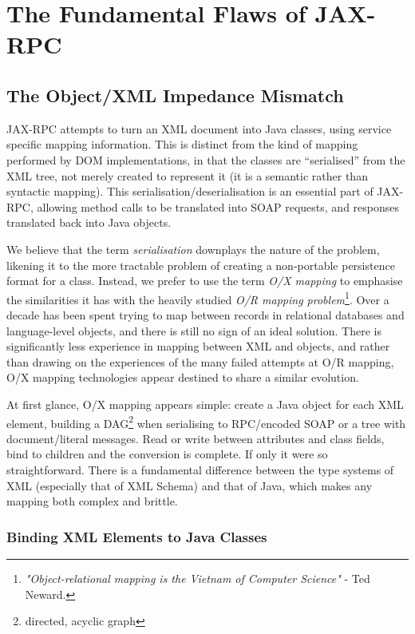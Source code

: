\section{The Fundamental Flaws of JAX-RPC}
\label{objections}

\subsection{The Object/XML Impedance Mismatch}
\label{objections:o-x}

JAX-RPC attempts to turn an XML document into Java classes, using
service specific mapping information. This is distinct from the kind
of mapping performed by DOM implementations, in that the classes are
``serialised'' from the XML tree, not merely created to represent it
(it is a semantic rather than syntactic mapping). This
serialisation/deserialisation is an essential part of JAX-RPC,
allowing method calls to be translated into SOAP requests, and
responses translated back into Java objects.

We believe that the term \emph{serialisation} downplays the nature of
the problem, likening it to the more tractable problem of creating a
non-portable persistence format for a class. Instead, we prefer to use
the term \emph{O/X mapping} to emphasise the similarities it has with
the heavily studied \emph{O/R mapping problem}\footnote{
\emph{"Object-relational mapping is the Vietnam of Computer Science"}
- Ted Neward.
}. 
Over a decade has been spent trying to map between records in relational
databases and language-level objects, and there is still no sign of an ideal
solution. There is significantly less experience in mapping between XML and
objects, and rather than drawing on the experiences of the many failed attempts
at O/R mapping, O/X mapping technologies appear destined to share a similar
evolution.

At first glance, O/X mapping appears simple: create a Java object for
each XML element, building a DAG\footnote{directed, acyclic graph}
when serialising to RPC/encoded SOAP or a tree with document/literal
messages. Read or write between attributes and class fields, bind to
children and the conversion is complete. If only it were so
straightforward. There is a fundamental difference between the type
systems of XML (especially that of XML Schema) and that of Java, which
makes any mapping both complex and brittle.

\subsubsection{Binding XML Elements to Java Classes}
\label{objections:o-x:xml-classes}

